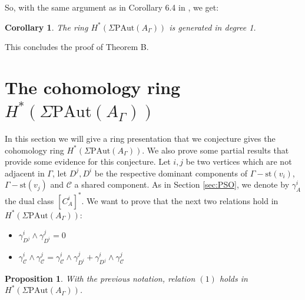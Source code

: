 \documentclass[a4paper]{amsart}
\newcommand{\G}{\Gamma}
\newcommand{\A}{{A_\Gamma}}
\newcommand{\PAut}{\Sigma\mathrm{PAut}}
\newcommand{\st}{\mathrm{st}}
\newtheorem{prop}[teo]{Proposition}
\newtheorem{cor}[teo]{Corollary}
\theoremstyle{definition}
\theoremstyle{remark}
\begin{document}
So, with the same argument as in  Corollary 6.4 in \cite{JMcCM}, we get:
\begin{cor}
   The ring $H^*(\PAut(A_\G))$ is generated in degree 1. \label{cor:onedimPAut}
\end{cor}
This concludes the proof of Theorem B.

\section{The cohomology ring $H^*(\PAut(\A))$}
\label{sec:ring}

In this section we will give a ring presentation that we conjecture gives the   cohomology ring  $H^*(\PAut(\A))$. We also prove some partial results that provide some evidence for this conjecture.
Let $i,j$ be two vertices which are not adjacent in $\G$, let $D^j, D^i$ be the respective dominant components of $\G-\st(v_i)$, $\G-\st(v_j)$ and $\mathcal{C}$ a shared component. As in Section \ref{sec:PSO}, we denote by  $\gamma_{A}^i$  the dual class $[C_{A}^i]^*$. We want to prove that the next two relations  hold in $H^*(\PAut(\A))$:

\begin{itemize}
    \item[(1)] $\gamma_{D^j}^i\wedge \gamma_{D^i}^j=0$ 
    \item[(2)] $\gamma_{\mathcal{C}}^i\wedge \gamma_{\mathcal{C}}^j=\gamma_{\mathcal{C}}^i\wedge \gamma_{D^i}^j+ \gamma_{D^j}^i\wedge\gamma_{\mathcal{C}}^j$ 
\end{itemize}

\begin{prop} 
   With the previous notation, relation $(1)$ holds in $H^*(\PAut(A_\G))$.\label{prop:rel1}
\end{prop}
\end{document}
